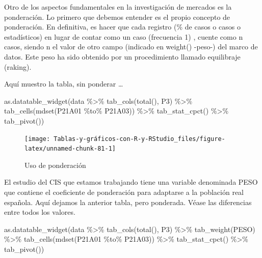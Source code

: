\documentclass[
]{book}
\newenvironment{Shaded}{\begin{snugshade}}{\end{snugshade}}
\newcommand{\FunctionTok}[1]{\textcolor[rgb]{0.00,0.00,0.00}{#1}}
\newcommand{\NormalTok}[1]{#1}
\newcommand{\SpecialCharTok}[1]{\textcolor[rgb]{0.00,0.00,0.00}{#1}}
\begin{document}
Otro de los aspectos fundamentales en la investigación de mercados es la ponderación. Lo primero que debemos entender es el propio concepto de ponderación. En definitiva, es hacer que cada registro (\% de casos o casos o estadísticos) en lugar de contar como un caso (frecuencia 1) , cuente como n casos, siendo n el valor de otro campo (indicado en weight() -peso-) del marco de datos. Este peso ha sido obtenido por un procedimiento llamado equilibraje (raking).

Aquí muestro la tabla, sin ponderar \ldots{}

\begin{Shaded}
\begin{Highlighting}[]
\FunctionTok{as.datatable\_widget}\NormalTok{(data }\SpecialCharTok{\%\textgreater{}\%} \FunctionTok{tab\_cols}\NormalTok{(}\FunctionTok{total}\NormalTok{(), P3) }\SpecialCharTok{\%\textgreater{}\%} \FunctionTok{tab\_cells}\NormalTok{(}\FunctionTok{mdset}\NormalTok{(P21A01 }\SpecialCharTok{\%to\%} 
\NormalTok{  P21A03)) }\SpecialCharTok{\%\textgreater{}\%} \FunctionTok{tab\_stat\_cpct}\NormalTok{() }\SpecialCharTok{\%\textgreater{}\%} \FunctionTok{tab\_pivot}\NormalTok{())}
\end{Highlighting}
\end{Shaded}

\begin{figure}[H]

{\centering \texttt{[image: Tablas-y-gráficos-con-R-y-RStudio\_files/figure-latex/unnamed-chunk-81-1]} 

}

\caption{Uso de ponderación}\label{fig:unnamed-chunk-81}
\end{figure}

El estudio del CIS que estamos trabajando tiene una variable denominada PESO que contiene el coeficiente de ponderación para adaptarse a la población real española. Aquí dejamos la anterior tabla, pero ponderada. Véase las diferencias entre todos los valores.

\begin{Shaded}
\begin{Highlighting}[]
\FunctionTok{as.datatable\_widget}\NormalTok{(data }\SpecialCharTok{\%\textgreater{}\%} \FunctionTok{tab\_cols}\NormalTok{(}\FunctionTok{total}\NormalTok{(), P3) }\SpecialCharTok{\%\textgreater{}\%} \FunctionTok{tab\_weight}\NormalTok{(PESO) }\SpecialCharTok{\%\textgreater{}\%} 
  \FunctionTok{tab\_cells}\NormalTok{(}\FunctionTok{mdset}\NormalTok{(P21A01 }\SpecialCharTok{\%to\%}\NormalTok{ P21A03)) }\SpecialCharTok{\%\textgreater{}\%} \FunctionTok{tab\_stat\_cpct}\NormalTok{() }\SpecialCharTok{\%\textgreater{}\%} 
  \FunctionTok{tab\_pivot}\NormalTok{())}
\end{Highlighting}
\end{Shaded}
\end{document}
